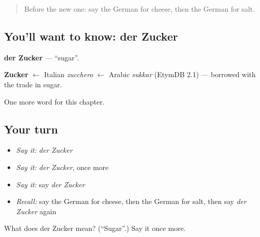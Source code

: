 \begin{quote}
Before the new one: say the German for cheese, then the German for salt.
\end{quote}

\subsection*{You'll want to know: der Zucker}
\textbf{der Zucker} — \textquotedblleft{}sugar\textquotedblright{}.

\begin{cousinweb}
\textbf{Zucker} $\leftarrow$ Italian \emph{zucchero} $\leftarrow$ Arabic \emph{sukkar} (EtymDB 2.1) — borrowed with the trade in sugar.
\end{cousinweb}

\begin{grammarlens}[title={What you've built}]
One more word for this chapter.
\end{grammarlens}

\subsection*{Your turn}
\begin{itemize}
\raggedright
  \item \emph{Say it:} \emph{der Zucker}
  \item \emph{Say it:} \emph{der Zucker}, once more
  \item \emph{Say it:} say \emph{der Zucker}
  \item \emph{Recall:} say the German for cheese, then the German for salt, then say \emph{der Zucker} again
\end{itemize}

\begin{tcolorbox}[breakable,colback=teal!4,colframe=teal!35!black,title={Before you move on}]
What does der Zucker mean? (\textquotedblleft{}Sugar\textquotedblright{}.) Say it once more.
\end{tcolorbox}
